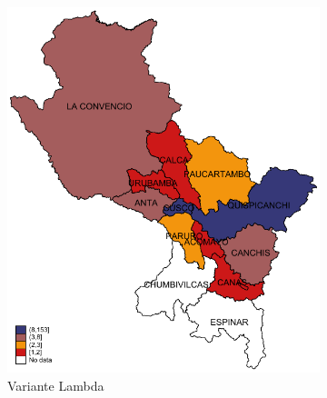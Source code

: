 \documentclass[12pt,a4paper,openany]{book}
\begin{document}
			\begin{figure}[h]
				\caption{Distribución provincial de las variantes de SARS-CoV-2 aisladas en la Región Cusco hasta la SE 07-2022.}
				\label{fig:mapa_variantes}
				\centering
				\begin{subfigure}[b]{0.40\textwidth}
					\centering
					\includegraphics[width=\textwidth]{../figuras/variantes_provincial_lambda.pdf}
					\caption{Variante Lambda}
				\end{subfigure}
				\hfill
				\begin{subfigure}[b]{0.40\textwidth}
					\centering

\end{subfigure}
\end{figure}
\end{document}
